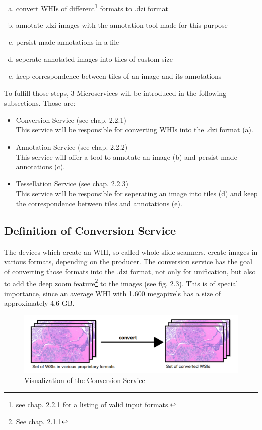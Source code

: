 \begin{enumerate}[(a)]
	\item convert WHIs of different\footnote{see chap. 2.2.1 for a listing of valid input formats.} formats to .dzi format
	\item annotate .dzi images with the annotation tool made for this purpose
	\item persist made annotations in a file
	\item seperate annotated images into tiles of custom size
	\item keep correspondence between tiles of an image and its annotations
\end{enumerate}

To fulfill those steps, 3 Microservices will be introduced in the following subsections. Those are:

\begin{itemize}
	\item Conversion Service (see chap. 2.2.1)\\
	This service will be responsible for converting WHIs into the .dzi format (a).
	\item Annotation Service (see chap. 2.2.2)\\
	This service will offer a tool to annotate an image (b) and persist made annotations (c).
	\item Tessellation Service (see chap. 2.2.3)\\
	This service will be responsible for seperating an image into tiles (d) and keep the correspondence between tiles and annotations (e).
\end{itemize}


\subsection{Definition of Conversion Service}

The devices which create an WHI, so called whole slide scanners, create images in various formats, depending on the producer. The conversion service has the goal of converting those formats into the .dzi format, not only for unification, but also to add the deep zoom feature\footnote{See chap. 2.1.1} to the images (see fig. 2.3). This is of special importance, since an average WHI with 1.600 megapixels has a size of approximately 4.6 GB\cite{Farahanil15}.

\begin{figure}[H]
	\begin{center}
		\includegraphics[scale=0.35]{img/processChainA.png}
		\caption{Visualization of the Conversion Service}
		\label{fig:fig2.3}
	\end{center}
\end{figure}

